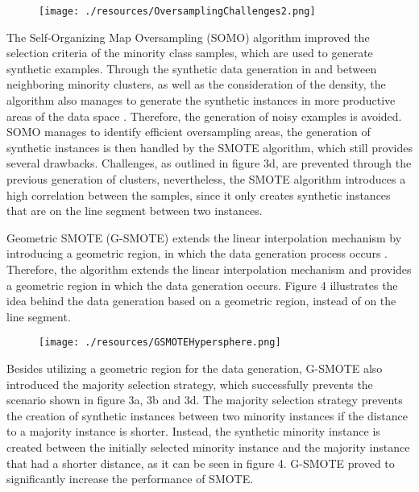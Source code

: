 \documentclass[parskip=full]{scrartcl}
\begin{document}
\begin{figure}[H]
	\centering
	\texttt{[image: ./resources/OversamplingChallenges2.png]}
\end{figure}

The Self-Organizing Map Oversampling (SOMO) algorithm improved the selection
criteria of the minority class samples, which are used to generate synthetic
examples. Through the synthetic data generation in and between neighboring
minority clusters, as well as the consideration of the density, the algorithm
also manages to generate the synthetic instances in more productive areas of the
data space \cite{Douzas2017B}. Therefore, the generation of noisy examples is
avoided. SOMO manages to identify efficient oversampling areas, the generation
of synthetic instances is then handled by the SMOTE algorithm, which still
provides several drawbacks. Challenges, as outlined in figure 3d, are prevented
through the previous generation of clusters, nevertheless, the SMOTE algorithm
introduces a high correlation between the samples, since it only creates
synthetic instances that are on the line segment between two instances.

Geometric SMOTE (G-SMOTE) extends the linear interpolation mechanism by
introducing a geometric region, in which the data generation process occurs
\cite{Douzas2017}. Therefore, the algorithm extends the linear interpolation
mechanism and provides a geometric region in which the data generation occurs.
Figure 4 illustrates the idea behind the data generation based on a geometric
region, instead of on the line segment. 

\begin{figure}[H]
	\centering
	\texttt{[image: ./resources/GSMOTEHypersphere.png]}
\end{figure}

Besides utilizing a geometric region for the data generation, G-SMOTE also
introduced the majority selection strategy, which successfully prevents the
scenario shown in figure 3a, 3b and 3d. The majority selection strategy prevents
the creation of synthetic instances between two minority instances if the
distance to a majority instance is shorter. Instead, the synthetic minority
instance is created between the initially selected minority instance and the
majority instance that had a shorter distance, as it can be seen in figure 4.
G-SMOTE proved to significantly increase the performance of SMOTE. 
\end{document}

